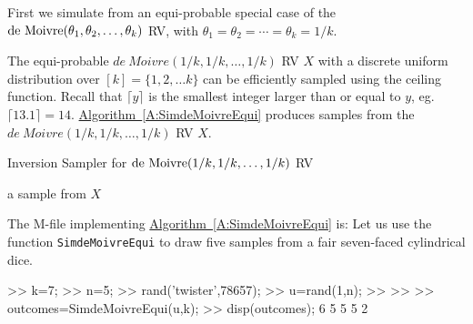 First we simulate from an equi-probable special case of the $\mbox{{\rm de~Moivre}}(\theta_1,\theta_2,\ldots,\theta_k)$ RV, with $\theta_1=\theta_2=\cdots=\theta_k=1/k$.
\begin{simulation}\label{SIM:deMoivreEqui}
The equi-probable $de~Moivre(1/k,1/k,\ldots,1/k)$ RV $X$ with a discrete uniform distribution over $[k] = \{1,2,\ldots k\}$ can be efficiently sampled using the ceiling function.  Recall that $\lceil y \rceil$ is the smallest integer larger than or equal to $y$, eg.~$\lceil 13.1 \rceil = 14$.  \hyperref[A:SimdeMoivreEqui]{Algorithm~\ref*{A:SimdeMoivreEqui}} produces samples from the $de~Moivre(1/k,1/k,\ldots,1/k)$ RV $X$.

\begin{algorithm}[h]
\caption{ Inversion Sampler  for $\mbox{{\rm de~Moivre}}(1/k,1/k,\ldots,1/k)$ RV}
\label{A:SimdeMoivreEqui}
\begin{algorithmic}[1]
 a sample from $X$
\end{algorithmic}
\end{algorithm}

The M-file implementing \hyperref[A:SimdeMoivreEqui]{Algorithm~\ref*{A:SimdeMoivreEqui}} is:
Let us use the function {\tt SimdeMoivreEqui} to draw five samples from a fair seven-faced cylindrical dice.
\begin{VrbM}
>> k=7; %
>> n=5; %
>> rand('twister',78657); %
>> u=rand(1,n); %
>> %
>> %
>> outcomes=SimdeMoivreEqui(u,k); %
>> disp(outcomes);
     6     5     5     5     2
\end{VrbM}
\end{simulation}

